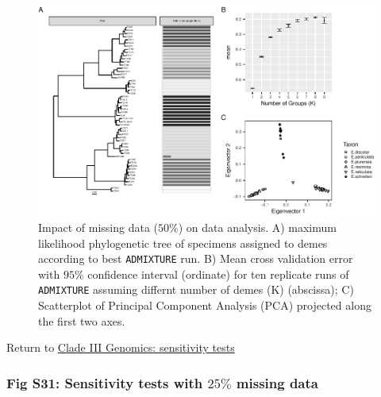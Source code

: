 \documentclass[
  11pt,
]{article}
\begin{document}
\begin{figure}
\includegraphics{Supplementary_Material_files/figure-latex/cladeIIIgenomicSensitivityAnalysesMiddleplots-1} \caption{Impact of missing data ($50\%$) on data analysis. A) maximum likelihood phylogenetic tree of specimens assigned to demes according to best \texttt{ADMIXTURE} run. B) Mean cross validation error with $95\%$ confidence interval (ordinate) for ten replicate runs of \texttt{ADMIXTURE} assuming differnt number of demes (K) (abscissa); C) Scatterplot of Principal Component Analysis (PCA) projected along the first two axes.}\label{fig:cladeIIIgenomicSensitivityAnalysesMiddleplots}
\end{figure}

Return to \protect\hyperlink{sensitivity-tests-2}{Clade III Genomics: sensitivity tests}
\pagebreak

\hypertarget{fig-s31-sensitivity-tests-with-25-missing-data}{%
\subsubsection{\texorpdfstring{Fig S31: Sensitivity tests with \(25\%\) missing data}{Fig S31: Sensitivity tests with 25\textbackslash\% missing data}}\label{fig-s31-sensitivity-tests-with-25-missing-data}}
\end{document}
